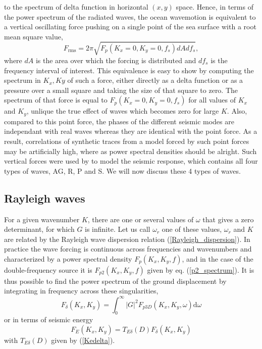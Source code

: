 to the spectrum of delta function in horizontal $(x,y)$ space. Hence, in terms of the power spectrum of the radiated waves, the ocean wavemotion is equivalent to a vertical oscillating force pushing on a single point of the sea surface with a root mean square value, 
\begin{equation}
F_{\mathrm{rms}} = 2 \pi \sqrt{F_{p}(K_x=0,K_y=0,f_s) dA d f_s},
\end{equation}
where $dA$ is the area over which the forcing is distributed and $d f_s$ is the frequency interval of interest. This 
equivalence is easy to show by computing the spectrum in $K_x,Ky$ of such a force, either directly as a delta function or as a pressure over a 
small square and taking the size of that square to zero. The spectrum of that force is equal to $F_{p}(K_x=0,K_y=0,f_s)$ for all values of $K_x$ and $K_y$, 
unlique the true effect of waves which becomes zero for large $K$. Also, compared to this point force, the phases of the different seismic modes are independant 
with real waves whereas they are identical with the point force. As a result, correlations of synthetic traces from a model forced 
by such point forces may be artificially high, where as power spectral densities should be alright. Such vertical forces were used by \cite{Gualtieri&al.2013} to 
model the seismic response, which contains all four types of waves, AG, R, P and S. We will now discuss these 4 types of waves. 

\subsection{Rayleigh waves}
For a given wavenumber $K$, there are one or several 
values of $\omega$ that gives a zero determinant, for which $G$ is infinite. Let us call $\omega_r$ one of these values, 
$\omega_r$ and $K$ are related by the Rayleigh wave dispersion relation 
(\ref{Rayleigh_dispersion}). 
In practice the wave forcing is continuous across frequencies and wavenumbers 
and characterized by a power spectral density $F_{p}(K_x,K_y,f)$, and in the case of the double-frequency source it is $F_{p2}(K_x,K_y,f)$ given by eq. (\ref{p2_spectrum}). It is thus possible 
to find the power spectrum of the ground displacement by integrating in frequency across these 
singularities, 
\begin{equation}
F_\delta(K_x,K_y) = \int_{0}^{\infty} \left|G\right|^2 F_{p3D}(K_x,K_y,\omega) {\mathrm d}{\omega}
\end{equation}
or in terms of seismic energy
\begin{equation}
F_E(K_x,K_y) = T_{E \delta}(D)  F_\delta (K_x,K_y) 
\end{equation}
with $ T_{E \delta}(D)$ given by (\ref{Kedelta}). 

